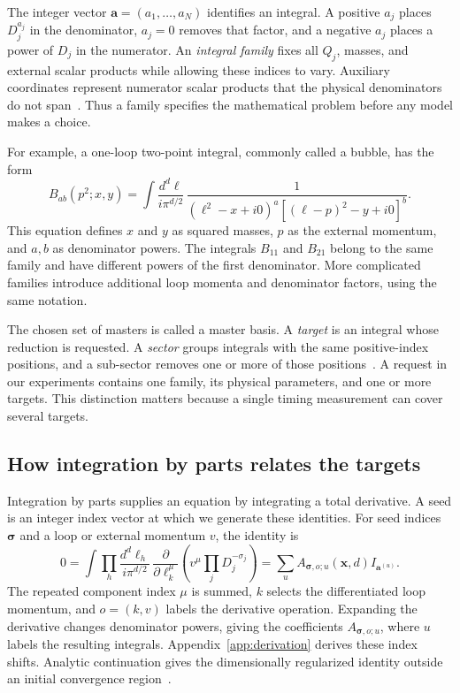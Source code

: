 The integer vector $\boldsymbol a=(a_1,\ldots,a_N)$ identifies an integral. A positive $a_j$ places $D_j^{a_j}$ in the denominator, $a_j=0$ removes that factor, and a negative $a_j$ places a power of $D_j$ in the numerator. An \emph{integral family} fixes all $Q_j$, masses, and external scalar products while allowing these indices to vary. Auxiliary coordinates represent numerator scalar products that the physical denominators do not span~\cite{KiraOriginal}. Thus a family specifies the mathematical problem before any model makes a choice.

For example, a one-loop two-point integral, commonly called a bubble, has the form
\begin{equation}
 B_{ab}(p^2;x,y)=
 \int\frac{d^d\ell}{i\pi^{d/2}}\,
 \frac{1}{(\ell^2-x+i0)^a[(\ell-p)^2-y+i0]^b}.
 \label{eq:example-bubble}
\end{equation}
This equation defines $x$ and $y$ as squared masses, $p$ as the external momentum, and $a,b$ as denominator powers. The integrals $B_{11}$ and $B_{21}$ belong to the same family and have different powers of the first denominator. More complicated families introduce additional loop momenta and denominator factors, using the same notation.

The chosen set of masters is called a master basis. A \emph{target} is an integral whose reduction is requested. A \emph{sector} groups integrals with the same positive-index positions, and a sub-sector removes one or more of those positions~\cite{KiraOriginal}. A request in our experiments contains one family, its physical parameters, and one or more targets. This distinction matters because a single timing measurement can cover several targets.

\subsection{How integration by parts relates the targets}
Integration by parts supplies an equation by integrating a total derivative. A seed is an integer index vector at which we generate these identities. For seed indices $\boldsymbol\sigma$ and a loop or external momentum $v$, the identity is~\cite{ChetyrkinTkachov}
\begin{equation}
 0=\int\prod_h\frac{d^d\ell_h}{i\pi^{d/2}}\,
 \frac{\partial}{\partial\ell_k^\mu}
 \left(v^\mu\prod_jD_j^{-\sigma_j}\right)
 =\sum_u A_{\boldsymbol\sigma,o;u}(\boldsymbol x,d)
 I_{\boldsymbol a^{(u)}}.
 \label{eq:identity}
\end{equation}
The repeated component index $\mu$ is summed, $k$ selects the differentiated loop momentum, and $o=(k,v)$ labels the derivative operation. Expanding the derivative changes denominator powers, giving the coefficients $A_{\boldsymbol\sigma,o;u}$, where $u$ labels the resulting integrals. Appendix~\ref{app:derivation} derives these index shifts. Analytic continuation gives the dimensionally regularized identity outside an initial convergence region~\cite{ChetyrkinTkachov}.

